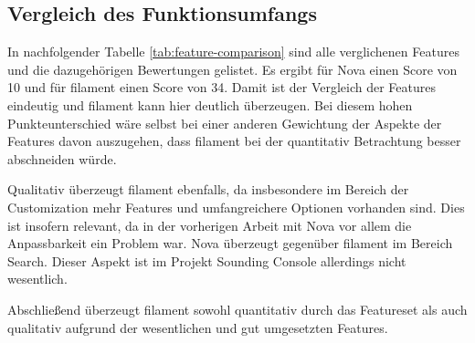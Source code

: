 \subsection{Vergleich des Funktionsumfangs}
In nachfolgender Tabelle \ref{tab:feature-comparison} sind alle verglichenen Features und die dazugehörigen Bewertungen gelistet.
Es ergibt für Nova einen Score von 10 und für filament einen Score von 34.
Damit ist der Vergleich der Features eindeutig und filament kann hier deutlich überzeugen.
Bei diesem hohen Punkteunterschied wäre selbst bei einer anderen Gewichtung der Aspekte der Features davon auszugehen, dass filament bei der quantitativ Betrachtung besser abschneiden würde.

Qualitativ überzeugt filament ebenfalls, da insbesondere im Bereich der Customization mehr Features und umfangreichere Optionen vorhanden sind.
Dies ist insofern relevant, da in der vorherigen Arbeit mit Nova vor allem die Anpassbarkeit ein Problem war.
Nova überzeugt gegenüber filament im Bereich Search.
Dieser Aspekt ist im Projekt Sounding Console allerdings nicht wesentlich.

Abschließend überzeugt filament sowohl quantitativ durch das Featureset als auch qualitativ aufgrund der wesentlichen und gut umgesetzten Features.


